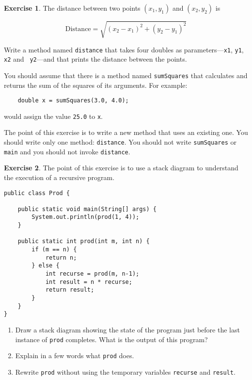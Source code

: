 \documentclass[12pt]{book}
\theoremstyle{definition}
\newtheorem{excz}{Exercise}[chapter]
\newenvironment{exercise}{\bigskip\begin{excz}\mbox{}}{\end{excz}}
\begin{document}
\begin{exercise}
The distance between two points $(x_1, y_1)$ and $(x_2, y_2)$
is

\[\mathrm{Distance} = \sqrt{(x_2 - x_1)^2 +(y_2 - y_1)^2} \]

Write a method named {\tt distance} that takes four
doubles as parameters---{\tt x1}, {\tt y1}, {\tt x2} and {\tt
y2}---and that prints the distance between the points.

You should assume that there is a method named {\tt sumSquares}
that calculates and returns the sum of the squares of its arguments.
For example:

\begin{lstlisting}
    double x = sumSquares(3.0, 4.0);
\end{lstlisting}
%
would assign the value {\tt 25.0} to {\tt x}.

The point of this exercise is to write a new method that uses an
existing one.  You should write only one method: {\tt distance}.  You
should not write {\tt sumSquares} or {\tt main} and you should not
invoke {\tt distance}.
\end{exercise}


\begin{exercise}
The point of this exercise is to use a stack diagram to understand
the execution of a recursive program.

\begin{lstlisting}
public class Prod {

    public static void main(String[] args) {
        System.out.println(prod(1, 4));
    }

    public static int prod(int m, int n) {
        if (m == n) {
            return n;
        } else {
            int recurse = prod(m, n-1);
            int result = n * recurse;
            return result;
        }
    }
}
\end{lstlisting}
%
\begin{enumerate}

\item Draw a stack diagram showing the state of the program just
before the last instance of {\tt prod} completes.
What is the output of this program?

\item Explain in a few words what {\tt prod} does.

\item Rewrite {\tt prod} without using the temporary variables
{\tt recurse} and {\tt result}.

\end{enumerate}
\end{exercise}
\end{document}
